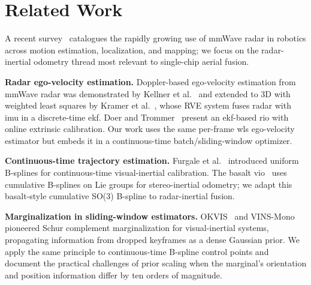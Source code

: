 \section{Related Work}
\label{sec:related}

A recent survey~\cite{harlow2024survey} catalogues the rapidly growing use
of mmWave radar in robotics across motion estimation, localization, and
mapping; we focus on the radar-inertial odometry thread most relevant to
single-chip aerial fusion.

\textbf{Radar ego-velocity estimation.}
Doppler-based ego-velocity estimation from mmWave radar was
demonstrated by Kellner et al.~\cite{kellner2014instantaneous} and
extended to 3D with weighted least squares by
Kramer et al.~\cite{kramer2020rve}, whose RVE system fuses radar
with \ac{imu} in a discrete-time \ac{ekf}.  Doer and
Trommer~\cite{doer2020ekf} present an \ac{ekf}-based \ac{rio} with online
extrinsic calibration. Our work uses the same per-frame \ac{wls}
ego-velocity estimator but embeds it in a continuous-time
batch/sliding-window optimizer.

\textbf{Continuous-time trajectory estimation.}
Furgale et al.~\cite{furgale2013unified} introduced uniform B-splines
for continuous-time visual-inertial calibration.  The basalt
\ac{vio}~\cite{usenko2020basalt} uses cumulative B-splines on Lie groups
for stereo-inertial odometry; we adapt this basalt-style
cumulative SO(3) B-spline to radar-inertial fusion.

\textbf{Marginalization in sliding-window estimators.}
OKVIS~\cite{leutenegger2015keyframe} and
VINS-Mono~\cite{qin2018vins} pioneered Schur complement
marginalization for visual-inertial systems, propagating information
from dropped keyframes as a dense Gaussian prior. We apply the same
principle to continuous-time B-spline control points and document
the practical challenges of prior scaling when the marginal's
orientation and position information differ by ten orders of magnitude.

